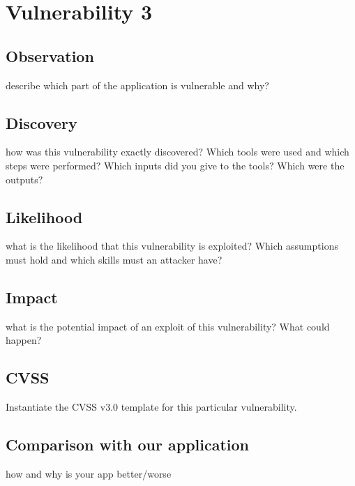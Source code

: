 \section{Vulnerability 3}
\subsection{Observation}
describe which part of the application is vulnerable and why?

\subsection{Discovery}
how was this vulnerability exactly discovered? Which tools were used and which
steps were performed? Which inputs did you give to the tools? Which were the outputs?

\subsection{Likelihood}
what is the likelihood that this vulnerability is exploited? Which assumptions must hold and which skills must an attacker have?

\subsection{Impact}
what is the potential impact of an exploit of this vulnerability? What could happen?

\subsection{CVSS}
Instantiate the CVSS v3.0 template for this particular vulnerability.

\subsection{Comparison with our application}
how and why is your app better/worse
\clearpage